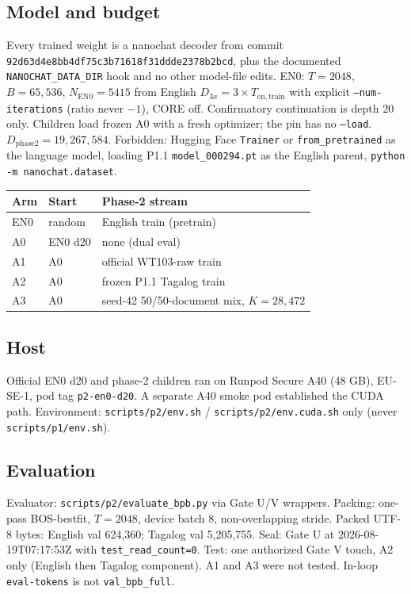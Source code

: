\documentclass[11pt,a4paper]{article}
\begin{document}
\subsection{Model and budget}
Every trained weight is a nanochat decoder from commit \texttt{92d63d4e8bb4df75c3b71618f31ddde2378b2bcd}, plus the documented \texttt{NANOCHAT\_DATA\_DIR} hook and no other model-file edits. EN0: $T=2048$, $B=65{,}536$, $N_{\mathrm{EN0}}=5415$ from English $D_{3x}=3\times T_{\mathrm{en,train}}$ with explicit \texttt{--num-iterations} (ratio never $-1$), CORE off. Confirmatory continuation is depth 20 only. Children load frozen A0 with a fresh optimizer; the pin has no \texttt{--load}. $D_{\mathrm{phase2}}=19{,}267{,}584$. Forbidden: Hugging Face \texttt{Trainer} or \texttt{from\_pretrained} as the language model, loading P1.1 \texttt{model\_000294.pt} as the English parent, \texttt{python -m nanochat.dataset}.

\begin{center}
\begin{tabular}{llp{7.2cm}}
\toprule
Arm & Start & Phase-2 stream \\
\midrule
EN0 & random & English train (pretrain) \\
A0 & EN0 d20 & none (dual eval) \\
A1 & A0 & official WT103-raw train \\
A2 & A0 & frozen P1.1 Tagalog train \\
A3 & A0 & seed-42 50/50-document mix, $K=28{,}472$ \\
\bottomrule
\end{tabular}
\end{center}

\subsection{Host}
Official EN0 d20 and phase-2 children ran on Runpod Secure A40 (48 GB), EU-SE-1, pod tag \texttt{p2-en0-d20}. A separate A40 smoke pod established the CUDA path. Environment: \texttt{scripts/p2/env.sh} / \texttt{scripts/p2/env.cuda.sh} only (never \texttt{scripts/p1/env.sh}).

\subsection{Evaluation}
Evaluator: \texttt{scripts/p2/evaluate\_bpb.py} via Gate U/V wrappers. Packing: one-pass BOS-bestfit, $T=2048$, device batch 8, non-overlapping stride. Packed UTF-8 bytes: English val 624{,}360; Tagalog val 5{,}205{,}755. Seal: Gate U at 2026-08-19T07:17:53Z with \texttt{test\_read\_count=0}. Test: one authorized Gate V touch, A2 only (English then Tagalog component). A1 and A3 were not tested. In-loop \texttt{eval-tokens} is not \texttt{val\_bpb\_full}.
\end{document}

